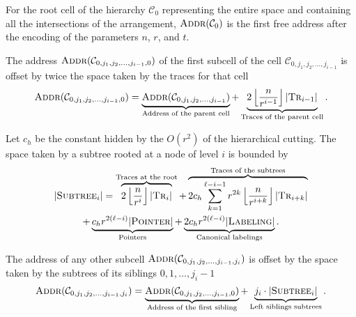
For the root cell of the hierarchy
\(\mathcal{C}_0\) representing the entire space and containing all the
intersections of the arrangement, \(\textsc{Addr}(\mathcal{C}_0)\) is the
first free address after the encoding of the parameters \(n\), \(r\), and \(t\).

The address \(\textsc{Addr}(\mathcal{C}_{0,j_1,j_2, \ldots, j_{i-1}, 0})\)
of the first subcell of the cell \(\mathcal{C}_{0,j_1,j_2, \ldots, j_{i-1}}\)
is offset by twice the space taken by the traces for that cell
%
\begin{displaymath}
  \textsc{Addr}(\mathcal{C}_{0,j_1,j_2, \ldots, j_{i-1}, 0})
  =
  \underbrace{\textsc{Addr}(\mathcal{C}_{0,j_1,j_2, \ldots, j_{i-1}})}_{\text{Address of the parent cell}}
  +
  \underbrace{2 \left\lfloor \frac{n}{r^{i-1}} \right\rfloor |\textsc{Tr}_{i-1}|}_{\text{Traces of the parent cell}}
  .
\end{displaymath}

Let \(c_h\) be the constant hidden by the \(O(r^2)\) of the hierarchical cutting.
%
The space taken by a subtree rooted at a node of level \(i\) is bounded by
\begin{multline*}
  | \textsc{Subtree}_i |
  =
  \overbrace{2 \left\lfloor \frac{n}{r^{i}} \right\rfloor |\textsc{Tr}_{i}|}^{\text{Traces at the root}}
  +
  \overbrace{2c_h \sum_{k=1}^{\ell-i-1} r^{2k} \left\lfloor \frac{n}{r^{i+k}}
  \right\rfloor |\textsc{Tr}_{i+k}|}^{\text{Traces of the subtrees}}\\
  +
  \underbrace{c_h r^{2(\ell-i)} | \textsc{Pointer} |}_{\text{Pointers}}
  +
  \underbrace{2c_h r^{2(\ell-i)} | \textsc{Labeling} |}_{\text{Canonical labelings}}.
\end{multline*}

The address of any other subcell
\(\textsc{Addr}(\mathcal{C}_{0,j_1,j_2, \ldots, j_{i-1}, j_{i}})\)
is offset by the space taken by the subtrees of its siblings \(0, 1, \ldots,
j_{i} - 1\)
%
\begin{displaymath}
  \textsc{Addr}(\mathcal{C}_{0,j_1,j_2, \ldots, j_{i-1}, j_{i}})
  =
  \underbrace{\textsc{Addr}(\mathcal{C}_{0,j_1,j_2, \ldots, j_{i-1}, 0})}_{\text{Address of the first sibling}}
  +
  \underbrace{j_{i} \cdot | \textsc{Subtree}_{i} |}_{\text{Left siblings subtrees}}
  .
\end{displaymath}

